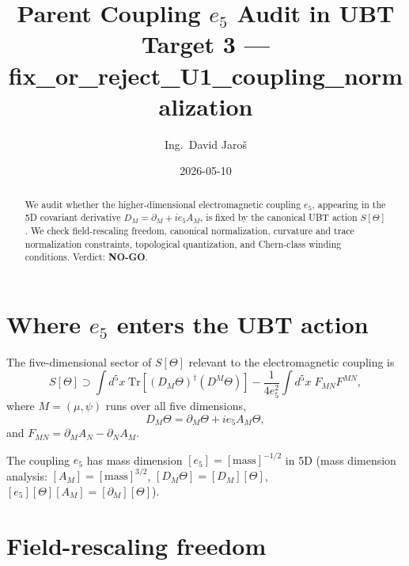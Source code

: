 \documentclass[11pt,a4paper]{article}
\title{Parent Coupling $e_5$ Audit in UBT\\
\large Target 3 — fix\_or\_reject\_U1\_coupling\_normalization}
\author{Ing.\ David Jaroš}
\date{2026-05-10}
\begin{document}
\maketitle

\begin{abstract}
We audit whether the higher-dimensional electromagnetic coupling $e_5$,
appearing in the 5D covariant derivative $D_M=\partial_M+ie_5 A_M$, is fixed
by the canonical UBT action $S[\Theta]$.  We check field-rescaling freedom,
canonical normalization, curvature and trace normalization constraints,
topological quantization, and Chern-class winding conditions.
Verdict: \textbf{NO-GO}.
\end{abstract}

\section{Where $e_5$ enters the UBT action}

The five-dimensional sector of $S[\Theta]$ relevant to the electromagnetic
coupling is
\begin{equation}
  S[\Theta]\supset
  \int d^5x\;\mathrm{Tr}\!\left[(D_M\Theta)^\dagger(D^M\Theta)\right]
  -\frac{1}{4e_5^2}\int d^5x\;F_{MN}F^{MN},
\end{equation}
where $M=(\mu,\psi)$ runs over all five dimensions,
\begin{equation}
  D_M\Theta = \partial_M\Theta + ie_5 A_M\Theta,
\end{equation}
and $F_{MN}=\partial_M A_N - \partial_N A_M$.

The coupling $e_5$ has mass dimension $[e_5]=[\text{mass}]^{-1/2}$ in 5D
(mass dimension analysis: $[A_M]=[\text{mass}]^{3/2}$,
$[D_M\Theta]=[D_M][\Theta]$, $[e_5][\Theta][A_M]=[\partial_M][\Theta]$).

\section{Field-rescaling freedom}
\end{document}
